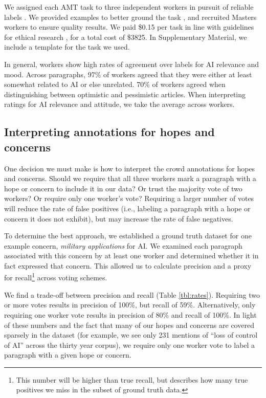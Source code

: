 \documentclass[letterpaper]{article}
\begin{document}
We assigned each AMT task to three independent workers in pursuit of reliable labels \cite{get-another-label}. We provided examples to better ground the task \cite{examples}, and recruited Masters workers to ensure quality results. We paid \$0.15 per task in line with guidelines for ethical research \cite{dynamo}, for a total cost of \$3825. In Supplementary Material, we include a template for the task we used.

In general, workers show high rates of agreement over labels for AI relevance and mood. Across paragraphs, 97\% of workers agreed that they were either at least somewhat related to AI or else unrelated. 70\% of workers agreed when distinguishing between optimistic and pessimistic articles. When interpreting ratings for AI relevance and attitude, we take the average across workers.

\subsection{Interpreting annotations for hopes and concerns}

One decision we must make is how to interpret the crowd annotations for  hopes and concerns. Should we require that all three workers mark a paragraph with a hope or concern to include it in our data? Or trust the majority vote of two workers? Or require only one worker's vote? Requiring a larger number of votes will reduce the rate of false positives (i.e., labeling a paragraph with a hope or concern it does not exhibit), but may increase the rate of false negatives.

To determine the best approach, we established a ground truth dataset for one example concern, \textit{military applications} for  AI. We examined each paragraph associated with this concern by at least one worker and determined whether it in fact expressed that concern. This allowed us to calculate precision and
a proxy for recall\footnote{This number will be higher than true recall, but describes how many true positives we miss in the subset of ground truth data.} across voting schemes.

We find a trade-off between precision and recall (Table \ref{tbl:rates}). Requiring two or more votes results in precision of 100\%, but recall of 59\%. Alternatively, only requiring one worker vote results in precision of 80\% and recall of 100\%. In light of these numbers and the fact that many of our hopes and concerns are covered sparsely in the dataset (for example, we see only 231 mentions of ``loss of control of AI'' across the thirty year corpus), we require only one worker vote to label a paragraph with a given hope or concern.
\end{document}
